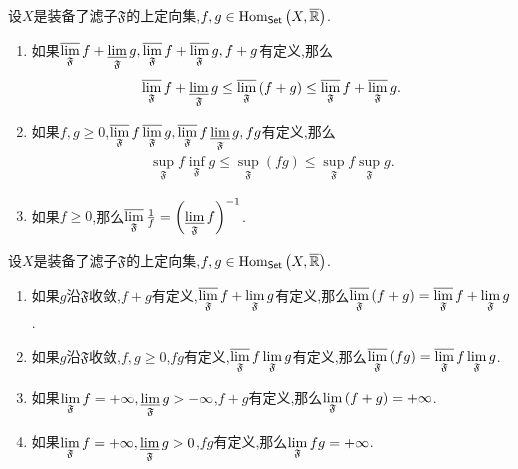 \begin{proposition}{}{}
	设$X$是装备了滤子$\mathfrak{F}$的上定向集,$f,g\in\operatorname{Hom}_{\mathsf{Set}}\left(X,\overline{\mathbb{R}}\right)$.
	\begin{enumerate}
		\item 如果$\varlimsup\limits_{\mathfrak{F}}f+\varliminf\limits_{\mathfrak{F}}g,\varlimsup\limits_{\mathfrak{F}}f+\varlimsup\limits_{\mathfrak{F}}g,f+g$有定义,那么
		\begin{align*}
			\varlimsup\limits_{\mathfrak{F}}f+\varliminf\limits_{\mathfrak{F}}g\leq\varlimsup\limits_{\mathfrak{F}}\left(f+g\right)\leq\varlimsup\limits_{\mathfrak{F}}f+\varlimsup\limits_{\mathfrak{F}}g.
		\end{align*}
		\item 如果$f,g\geq 0$,$\varlimsup\limits_{\mathfrak{F}}f\varlimsup\limits_{\mathfrak{F}}g,\varlimsup\limits_{\mathfrak{F}}f\varliminf\limits_{\mathfrak{F}}g,fg$有定义,那么
		\begin{align*}
			\sup\limits_{\mathfrak{F}}f\inf\limits_{\mathfrak{F}}g\leq\sup\limits_{\mathfrak{F}}\left(fg\right)\leq\sup\limits_{\mathfrak{F}}f\sup\limits_{\mathfrak{F}}g.
		\end{align*}
		\item 如果$f\geq 0$,那么$\varlimsup\limits_{\mathfrak{F}}\frac{1}{f}=\left(\varliminf\limits_{\mathfrak{F}}f\right)^{-1}$.
	\end{enumerate}
\end{proposition}

\begin{corollary}{}{}
	设$X$是装备了滤子$\mathfrak{F}$的上定向集,$f,g\in\operatorname{Hom}_{\mathsf{Set}}\left(X,\overline{\mathbb{R}}\right)$.
	\begin{enumerate}
		\item 如果$g$沿$\mathfrak{F}$收敛,$f+g$有定义,$\varlimsup\limits_{\mathfrak{F}}f+\displaystyle\lim_{\mathfrak{F}}g$有定义,那么$\varlimsup\limits_{\mathfrak{F}}\left(f+g\right)=\varlimsup\limits_{\mathfrak{F}}f+\displaystyle\lim_{\mathfrak{F}}g$.
		\item 如果$g$沿$\mathfrak{F}$收敛,$f,g\geq 0$,$fg$有定义,$\varlimsup\limits_{\mathfrak{F}}f\displaystyle\lim_{\mathfrak{F}}g$有定义,那么$\varlimsup\limits_{\mathfrak{F}}\left(fg\right)=\varlimsup\limits_{\mathfrak{F}}f\displaystyle\lim_{\mathfrak{F}}g$.
		\item 如果$\displaystyle\lim_{\mathfrak{F}}f=+\infty,\varliminf\limits_{\mathfrak{F}}g>-\infty$,$f+g$有定义,那么$\displaystyle\lim_{\mathfrak{F}}\left(f+g\right)=+\infty$.
		\item 如果$\displaystyle\lim_{\mathfrak{F}}f=+\infty,\varliminf\limits_{\mathfrak{F}}g>0$,$fg$有定义,那么$\displaystyle\lim_{\mathfrak{F}}fg=+\infty$.
	\end{enumerate}
\end{corollary}